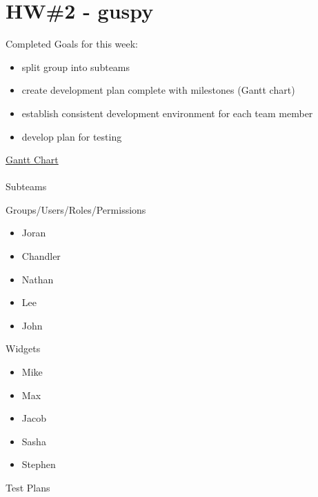 \documentclass[12pt]{article}
\begin{document}
\section *  {HW\#2 - guspy} 
Completed Goals for this week:
	\begin {itemize}
\item split group into subteams
\item create development plan complete with milestones (Gantt chart)
\item establish consistent development environment for each team member
\item develop plan for testing
\end{itemize}
\href{https://doc-0s-84-docs.googleusercontent.com/docs/secure/i334la2hu6jm7tnml3apbcanege08fqn/8ge6abfiol9jt70lr3mql4hl2lqe41l4/1296108000000/07145567960580470715/08963930125627892319/0BxVPr2RPStHxYmU5NWVjYWQtM2RiZC00ZmE5LThiMTktZDRiOGY4M2ViMDgx?authkey=CK_1264D&nonce=b6n07mlbqbp10&user=08963930125627892319&hash=ln71o85ussn0f7vm6sfoqi5eu5ej5jeb}{Gantt Chart}
\\
\\
Subteams 
	\begin{description}
\item Groups/Users/Roles/Permissions
		\begin{itemize}
\item Joran
\item Chandler
\item Nathan
\item Lee
\item John
		\end{itemize}
\item Widgets
		\begin{itemize}
\item Mike
\item Max
\item Jacob
\item Sasha
\item Stephen
		\end{itemize}
	\end{description}
%
Test Plans
\end{document}
